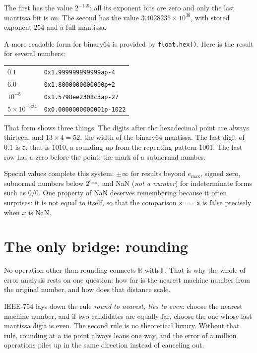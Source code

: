 The first has the value $2^{-149}$: all its exponent bits are zero and only the last
mantissa bit is on. The second has the value $3.4028235\times10^{38}$, with stored
exponent $254$ and a full mantissa.

A more readable form for binary64 is provided by \texttt{float.hex()}. Here is the result for several numbers:

\begin{center}
\begin{tabular}{ll}
\hline
$0.1$ & \texttt{0x1.999999999999ap-4} \\
$6.0$ & \texttt{0x1.8000000000000p+2} \\
$10^{-8}$ & \texttt{0x1.5798ee2308c3ap-27} \\
$5\times10^{-324}$ & \texttt{0x0.0000000000001p-1022} \\
\hline
\end{tabular}
\end{center}

That form shows three things. The digits after the hexadecimal point are always
thirteen, and $13\times4=52$, the width of the binary64 mantissa. The last digit of
$0.1$ is \texttt{a}, that is $1010$, a rounding up from the repeating pattern
$1001$. The last row has a zero before the point: the mark of a subnormal number.

Special values complete this system: $\pm\infty$ for results beyond
$e_{\max}$, signed zero, subnormal numbers below $2^{e_{\min}}$, and NaN
(\emph{not a number}) for indeterminate forms such as $0/0$. One property of NaN
deserves remembering because it often surprises: it is not equal to itself, so that
the comparison \texttt{x == x} is false precisely when $x$ is NaN.

\section{The only bridge: rounding}

No operation other than rounding connects $\mathbb{R}$ with $\mathbb{F}$. That is why
the whole of error analysis rests on one question: how far is the nearest machine number
from the original number, and how does that distance scale.

IEEE-754 lays down the rule \emph{round to nearest, ties to even}: choose the nearest
machine number, and if two candidates are equally far, choose the one whose last
mantissa digit is even. The second rule is no theoretical luxury. Without that rule,
rounding at a tie point always leans one way, and the error of a million operations
piles up in the same direction instead of canceling out.

